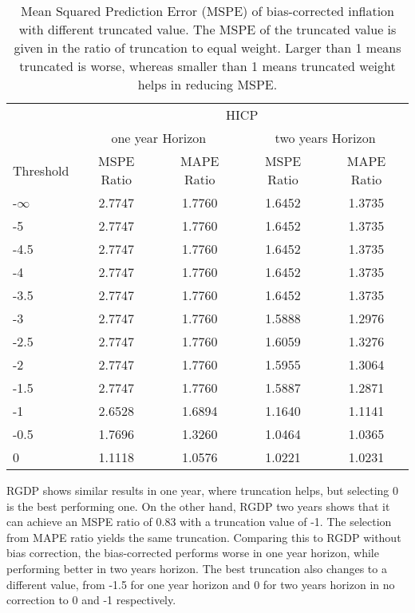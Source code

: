 \documentclass[11pt]{article}
\begin{document}
\begin{table}[!h]
	\centering
	\caption{Mean Squared Prediction Error (MSPE) of bias-corrected inflation with different truncated value. The MSPE of the truncated value is given in the ratio of truncation to equal weight. Larger than 1 means truncated is worse, whereas smaller than 1 means truncated weight helps in reducing MSPE.}
	\label{tab: MSPE HICP bias}
	\begin{tabular}{lcccc}
		\hline
		&                        \multicolumn{4}{c}{HICP}                         \\
		\cmidrule(lr){2-5}                              & \multicolumn{2}{c}{one year Horizon} & \multicolumn{2}{c}{two years Horizon} \\
		\cmidrule(lr){2-3} \cmidrule(lr){4-5}
		Threshold & MSPE Ratio & MAPE Ratio  & MSPE Ratio & MAPE Ratio  \\ \hline
		-$\infty$ & 2.7747 & 1.7760 & 1.6452 & 1.3735\\ 
		-5 & 2.7747 & 1.7760 & 1.6452 & 1.3735\\ 
		-4.5 & 2.7747 & 1.7760 & 1.6452 & 1.3735\\ 
		-4 & 2.7747 & 1.7760 & 1.6452 & 1.3735\\ 
		-3.5 & 2.7747 & 1.7760 & 1.6452 & 1.3735\\ 
		-3 & 2.7747 & 1.7760 & 1.5888 & 1.2976\\ 
		-2.5 & 2.7747 & 1.7760 & 1.6059 & 1.3276\\ 
		-2 & 2.7747 & 1.7760 & 1.5955 & 1.3064\\ 
		-1.5 & 2.7747 & 1.7760 & 1.5887 & 1.2871\\ 
		-1 & 2.6528 & 1.6894 & 1.1640 & 1.1141\\ 
		-0.5 & 1.7696 & 1.3260 & 1.0464 & 1.0365\\ 
		0 & 1.1118 & 1.0576 & 1.0221 & 1.0231\\ \hline
	\end{tabular}
\end{table}


RGDP shows similar results in one year, where truncation helps, but selecting 0 is the best performing one. On the other hand, RGDP two years shows that it can achieve an MSPE ratio of 0.83 with a truncation value of -1. The selection from MAPE ratio yields the same truncation. Comparing this to RGDP without bias correction, the bias-corrected performs worse in one year horizon, while performing better in two years horizon. The best truncation also changes to a different value, from -1.5 for one year horizon and 0 for two years horizon in no correction to 0 and -1 respectively.
\end{document}

